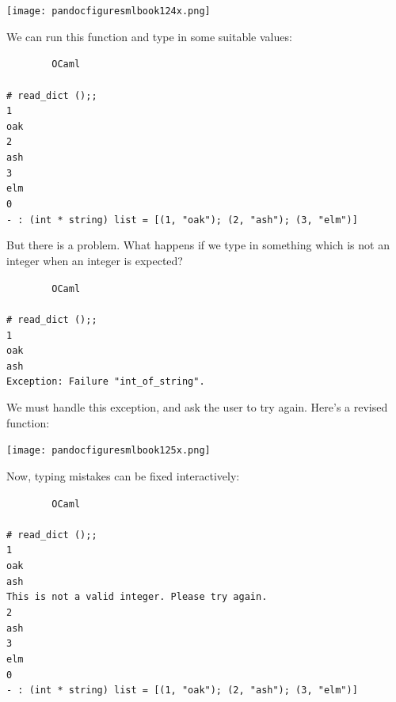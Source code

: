 \documentclass[]{book}
\newcommand{\smspace}{\vspace{4mm}}
\begin{document}
\medskip
\begin{center}
\noindent\texttt{[image: pandocfiguresmlbook124x.png]}
\end{center}
\medskip

\noindent We can run this function and type in some suitable values:

\newpage %

\smspace
\noindent\verb!        OCaml!\\
\noindent\\
\noindent\verb!# read_dict ();;!\\
\noindent\verb!1!\\
\noindent\verb!oak!\\
\noindent\verb!2!\\
\noindent\verb!ash!\\
\noindent\verb!3!\\
\noindent\verb!elm!\\
\noindent\verb!0!\\
\noindent\verb!- : (int * string) list = [(1, "oak"); (2, "ash"); (3, "elm")]!
\smspace

\noindent But there is a problem. What happens if we type in something which is not an integer when an integer is expected?

\smspace
\noindent\verb!        OCaml!\\
\noindent\\
\noindent\verb!# read_dict ();;!\\
\noindent\verb!1!\\
\noindent\verb!oak!\\
\noindent\verb!ash!\\
\noindent\verb!Exception: Failure "int_of_string".!
\smspace

\noindent We must handle this exception, and ask the user to try again. Here's a revised function:

\medskip
\begin{center}
\noindent\texttt{[image: pandocfiguresmlbook125x.png]}
\end{center}
\medskip

\noindent Now, typing mistakes can be fixed interactively:

\smspace
\noindent\verb!        OCaml!\\
\noindent\\
\noindent\verb!# read_dict ();;!\\
\noindent\verb!1!\\
\noindent\verb!oak!\\
\noindent\verb!ash!\\ 
\noindent\verb!This is not a valid integer. Please try again.!\\
\noindent\verb!2!\\
\noindent\verb!ash!\\
\noindent\verb!3!\\
\noindent\verb!elm!\\
\noindent\verb!0!\\
\noindent\verb!- : (int * string) list = [(1, "oak"); (2, "ash"); (3, "elm")]!
\end{document}
